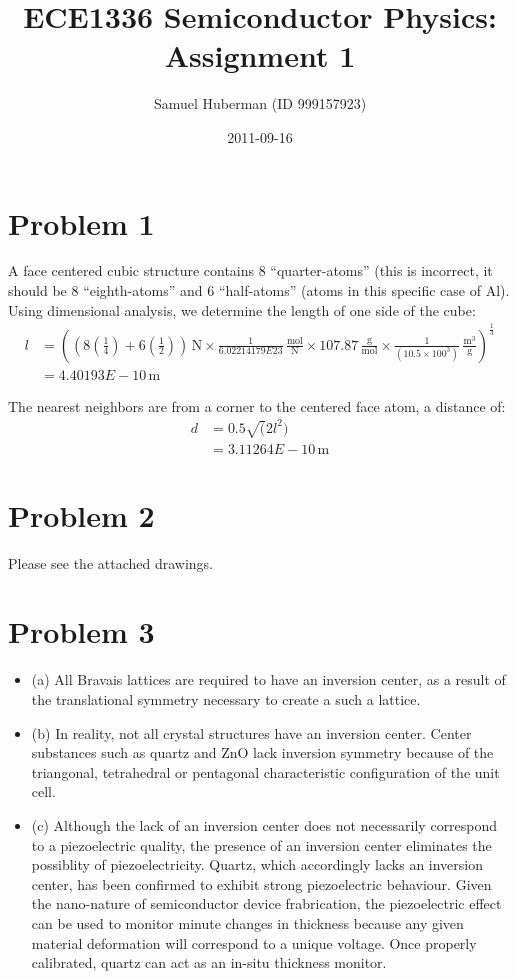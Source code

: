 \documentclass{article}
\newcommand{\unit}[1]{\ensuremath{\, \mathrm{#1}}}
\numberwithin{equation}{section}
\begin{document}
\title{ECE1336 Semiconductor Physics: Assignment 1}
\author{Samuel Huberman (ID 999157923)}
\date{2011-09-16}
\maketitle

\section*{Problem 1}

A face centered cubic structure contains 8 ``quarter-atoms'' (this is incorrect, it should be 8 ``eighth-atoms''  and 6 ``half-atoms'' (atoms in this specific case of Al). Using dimensional analysis, we determine the length of one side of the cube:
\begin{align*}
	l&=((8(\frac{1}{4})+6(\frac{1}{2}))\unit{N}\times\frac{1}{6.02214179E23}\unit{\frac{mol}{N}}\times 107.87\unit{\frac{g}{mol}}\times \frac{1}{(10.5\times 100^3)}\unit{\frac{m^3}{g}})^\frac{1}{3}
\\	 &=4.40193E-10\unit{m}
\end{align*}

The nearest neighbors are from a corner to the centered face atom, a distance of:
\begin{align*}
	d &= 0.5\sqrt(2l^2)
\\	 &= 3.11264E-10 \unit{m}
\end{align*}
\section*{Problem 2}
Please see the attached drawings.

\section*{Problem 3}
\begin{itemize}
\item(a) All Bravais lattices are required to have an inversion center, as a result of the translational symmetry necessary to create a such a lattice.

\item(b) In reality, not all crystal structures have an inversion center. Center substances such as quartz and ZnO lack inversion symmetry because of the triangonal, tetrahedral or pentagonal characteristic configuration of the unit cell.

\item(c) Although the lack of an inversion center does not necessarily correspond to a piezoelectric quality, the presence of an inversion center eliminates the possiblity of piezoelectricity. Quartz, which accordingly lacks an inversion center, has been confirmed to exhibit strong piezoelectric behaviour. Given the nano-nature of semiconductor device frabrication, the piezoelectric effect can be used to monitor minute changes in thickness because any given material deformation will correspond to a unique voltage. Once properly calibrated, quartz can act as an in-situ thickness monitor. 
\end{itemize}
\end{document}
